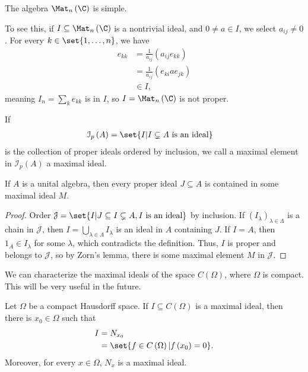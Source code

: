 \documentclass[10pt]{mypackage}
\begin{document}
\begin{example}
  The algebra $\Mat_n\left(\C\right)$ is simple.\newline

  To see this, if $I\subseteq \Mat_n\left(\C\right)$ is a nontrivial ideal, and $0 \neq a\in I$, we select $a_{ij}\neq 0$. For every $k\in \set{1,\dots,n}$, we have
  \begin{align*}
    e_{kk} &= \frac{1}{a_{ij}}\left(a_{ij}e_{kk}\right)\\
           &= \frac{1}{a_{ij}}\left(e_{ki}ae_{jk}\right)\\
           &\in I,
  \end{align*}
  meaning $I_n = \sum_{k}e_{kk}$ is in $I$, so $I = \Mat_n\left(\C\right)$ is not proper.
\end{example}
\begin{definition}
  If
  \begin{align*}
    \mathcal{I}_p\left(A\right) &= \set{I | I\subsetneq A\text{ is an ideal}}
  \end{align*}
    is the collection of proper ideals ordered by inclusion, we call a maximal element in $\mathcal{I}_p\left(A\right)$ a maximal ideal.
\end{definition}
\begin{theorem}
  If $A$ is a unital algebra, then every proper ideal $J\subseteq A$ is contained in some maximal ideal $M$.
\end{theorem}
\begin{proof}
  Order $\mathcal{J} = \set{I | J\subseteq I\subsetneq A,I\text{ is an ideal}}$ by inclusion. If $\left(I_{\lambda}\right)_{\lambda\in \Lambda}$ is a chain in $\mathcal{J}$, then $I = \bigcup_{\lambda\in\Lambda} I_{\lambda}$ is an ideal in $A$ containing $J$. If $I = A$, then $1_A\in I_{\lambda}$ for some $\lambda$, which contradicts the definition. Thus, $I$ is proper and belongs to $\mathcal{J}$, so by Zorn's lemma, there is some maximal element $M$ in $\mathcal{J}$.
\end{proof}
We can characterize the maximal ideals of the space $C\left(\Omega\right)$, where $\Omega$ is compact. This will be very useful in the future.
\begin{proposition}
  Let $\Omega$ be a compact Hausdorff space. If $I\subseteq C\left(\Omega\right)$ is a maximal ideal, then there is $x_0\in \Omega$ such that
  \begin{align*}
    I &= N_{x_0}\\
      &= \set{f\in C\left(\Omega\right) | f\left(x_0\right) = 0}.
  \end{align*}
  Moreover, for every $x\in \Omega$, $N_x$ is a maximal ideal.
\end{proposition}
\end{document}

